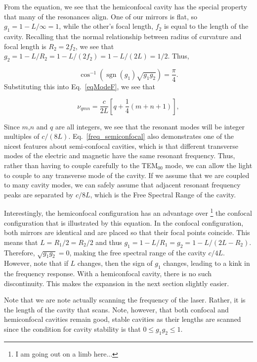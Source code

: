 From the equation, we see that the hemiconfocal cavity has the special property that many of the resonances align. One of our mirrors is flat, so $g_1=1-L/\infty=1$, while the other's focal length, $f_2$ is equal to the length of the cavity. Recalling that the normal relationship between radius of curvature and focal length is $R_2=2 f_2$, we see that $g_2=1-L/R_2=1-L/(2 f_2)=1-L/(2 L)=1/2$. Thus, 

\begin{equation}
\cos^{-1}(\operatorname{sgn}(g_1)\sqrt{g_1 g_2})=\frac{\pi}{4}.
\end{equation}
Substituting this into Eq.\ \ref{eqModeF}, we see that 

\begin{equation}\label{freq_semiconfocal}
\nu_{qmn}=\frac{c}{2L}\left[q + \frac{1}{4}(m+n+1)\right], 
\end{equation}

Since $m$,$n$ and $q$ are all integers, we see that the resonant modes will be integer multiples of $c/(8L)$. Eq.\ \ref{freq_semiconfocal} also demonstrates one of the nicest features about semi-confocal cavities, which is that different transverse modes of the electric and magnetic have the same resonant frequency. Thus, rather than having to couple carefully to the TEM$_{00}$ mode, we can allow the light to couple to any transverse mode of the cavity. If we assume that we are coupled to many cavity modes, we can safely assume that adjacent resonant frequency peaks are separated by $c/8L$, which is the Free Spectral Range of the cavity. 

Interestingly, the hemiconfocal configuration has an advantage over \footnote{I am going out on a limb here...} the confocal configuration that is illustrated by this equation. In the confocal configuration, both mirrors are identical and are placed so that their focal points coincide. This means that $L=R_1/2=R_2/2$ and thus $g_1=1-L/R_1=g_2=1-L/(2L-R_2)$. Therefore, $\sqrt{g_1g_2}=0$, making the free spectral range of the cavity $c/4L$. However, note that if $L$ changes, then the sign of $g_1$ changes, leading to a kink in the frequency response. With a hemiconfocal cavity, there is no such discontinuity. This makes the expansion in the next section slightly easier. 

Note that we are note actually scanning the frequency of the laser. Rather, it is the length of the cavity that scans. Note, however, that both confocal and hemiconfocal cavities remain good, stable cavities as their lengths are scanned since the condition for cavity stability is that $0\leq g_1 g_2 \leq 1$. 

